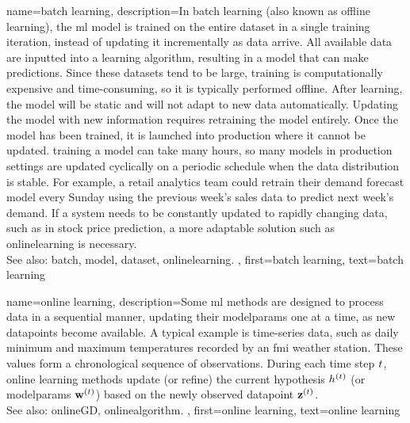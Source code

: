 {name={batch learning},
	description={In \gls{batch} learning (also known as offline learning), the \gls{ml} \gls{model} 
		is trained on the entire \gls{dataset} in a single \gls{training} iteration, instead of updating it incrementally as \gls{data} arrive. 
		All available \gls{data} are inputted into a learning \gls{algorithm}, resulting in a \gls{model} that can make \glspl{prediction}. 
		Since these \glspl{dataset} tend to be large, \gls{training} is computationally expensive and time-consuming, 
		so it is typically performed offline. After learning, the \gls{model} will be static and will not adapt to new \gls{data} automatically. 
		Updating the \gls{model} with new information requires retraining the \gls{model} entirely. Once the \gls{model} has been trained, 
		it is launched into production where it cannot be updated. \Gls{training} a \gls{model} can take many hours, so many \glspl{model} in production 
		settings are updated cyclically on a periodic schedule when the \gls{data} distribution is stable. For example, a retail analytics team 
		could retrain their demand forecast \gls{model} every Sunday using the previous week's sales \gls{data} to predict next week's demand. 
		If a system needs to be constantly updated to rapidly changing \gls{data}, such as in stock price \gls{prediction}, a more adaptable solution 
		such as \gls{onlinelearning} is necessary.
		\\
		See also: \gls{batch}, \gls{model}, \gls{dataset}, \gls{onlinelearning}. },
	first={batch learning}, 
	text={batch learning}
}

{name={online learning},
	description={Some \gls{ml} methods are designed to 
	    	process \gls{data} in a sequential manner, updating their \glspl{modelparam} 
		one at a time, as new \glspl{datapoint} become available. A typical example 
		is time-series \gls{data}, such as daily \gls{minimum} and \gls{maximum} 
		temperatures recorded by an \gls{fmi} weather station. These values form 
		a chronological sequence of observations. During each time step $t$, 
		online learning methods update (or refine) the current \gls{hypothesis} 
		$h^{(t)}$ (or \glspl{modelparam} ${\bf w}^{(t)}$) 
		based on the newly observed \gls{datapoint} ${\bf z}^{(t)}$. 
		\\ 
		See also: \gls{onlineGD}, \gls{onlinealgorithm}. },
	first={online learning},
	text={online learning} 
}

